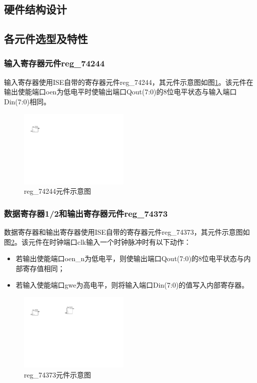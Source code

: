 \documentclass[a4paper]{ctexart}
\begin{document}
\begin{spacing}{1.3}
	\section{硬件结构设计}

	\subsection{各元件选型及特性}\label{各元件选型及特性}

	\subsubsection{输入寄存器元件reg\_74244}
	输入寄存器使用ISE自带的寄存器元件reg\_74244，其元件示意图如图\ref{fig:reg_74244}。该元件在输出使能端口oen为低电平时使输出端口Qout(7:0)的8位电平状态与输入端口Din(7:0)相同。
	\begin{figure}[htbp]
		\centering
		\includegraphics[width=0.47\textwidth]{figure/reg_74244.pdf}
		\caption{reg\_74244元件示意图}\label{fig:reg_74244}
	\end{figure}

	\subsubsection{数据寄存器1/2和输出寄存器元件reg\_74373}
	数据寄存器和输出寄存器使用ISE自带的寄存器元件reg\_74373，其元件示意图如图\ref{fig:reg_74373}。该元件在时钟端口clk输入一个时钟脉冲时有以下动作：
	\begin{itemize}
		\item 若输出使能端口oen\_n为低电平，则使输出端口Qout(7:0)的8位电平状态与内部寄存值相同；
		\item 若输入使能端口gwe为高电平，则将输入端口Din(7:0)的值写入内部寄存器。
	\end{itemize}
	\begin{figure}[htbp]
		\centering
		\includegraphics[width=0.47\textwidth]{figure/reg_74373.pdf}
		\caption{reg\_74373元件示意图}\label{fig:reg_74373}
	\end{figure}


\end{spacing}
\end{document}
